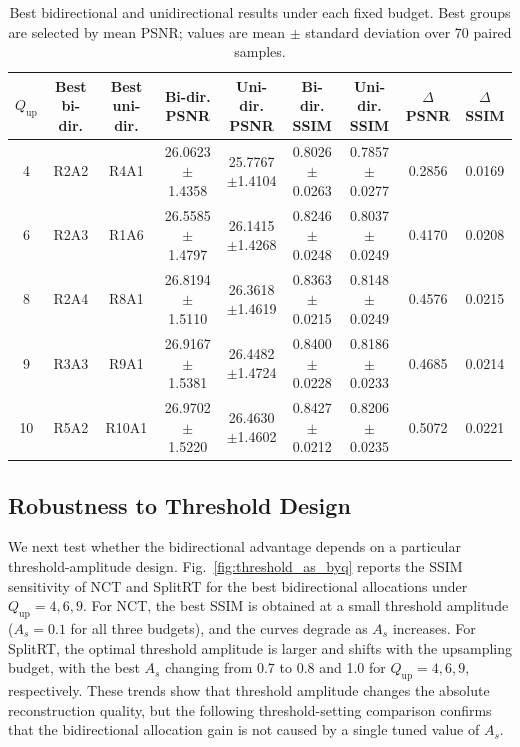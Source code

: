\documentclass[conference]{IEEEtran}
\begin{document}
\begin{table}[t]
\caption{Best bidirectional and unidirectional results under each fixed budget. Best groups are selected by mean PSNR; values are mean $\pm$ standard deviation over 70 paired samples.}
\begin{center}
\scriptsize
\setlength{\tabcolsep}{3pt}
\begin{tabular}{c c c c c c c c c}
\hline
$Q_{\mathrm{up}}$ & Best bi-dir. & Best uni-dir. & Bi-dir. PSNR & Uni-dir. PSNR & Bi-dir. SSIM & Uni-dir. SSIM & $\Delta$PSNR & $\Delta$SSIM \\
\hline
4  & R2A2 & R4A1  & 26.0623$\pm$1.4358 & 25.7767$\pm$1.4104 & 0.8026$\pm$0.0263 & 0.7857$\pm$0.0277 & 0.2856 & 0.0169 \\
6  & R2A3 & R1A6  & 26.5585$\pm$1.4797 & 26.1415$\pm$1.4268 & 0.8246$\pm$0.0248 & 0.8037$\pm$0.0249 & 0.4170 & 0.0208 \\
8  & R2A4 & R8A1  & 26.8194$\pm$1.5110 & 26.3618$\pm$1.4619 & 0.8363$\pm$0.0215 & 0.8148$\pm$0.0249 & 0.4576 & 0.0215 \\
9  & R3A3 & R9A1  & 26.9167$\pm$1.5381 & 26.4482$\pm$1.4724 & 0.8400$\pm$0.0228 & 0.8186$\pm$0.0233 & 0.4685 & 0.0214 \\
10 & R5A2 & R10A1 & 26.9702$\pm$1.5220 & 26.4630$\pm$1.4602 & 0.8427$\pm$0.0212 & 0.8206$\pm$0.0235 & 0.5072 & 0.0221 \\
\hline
\end{tabular}
\label{tab:main_gain}
\end{center}
\end{table}

\subsection{Robustness to Threshold Design}

We next test whether the bidirectional advantage depends on a particular threshold-amplitude design. Fig.~\ref{fig:threshold_as_byq} reports the SSIM sensitivity of NCT and SplitRT for the best bidirectional allocations under $Q_{\mathrm{up}}=4,6,9$. For NCT, the best SSIM is obtained at a small threshold amplitude ($A_s=0.1$ for all three budgets), and the curves degrade as $A_s$ increases. For SplitRT, the optimal threshold amplitude is larger and shifts with the upsampling budget, with the best $A_s$ changing from 0.7 to 0.8 and 1.0 for $Q_{\mathrm{up}}=4,6,9$, respectively. These trends show that threshold amplitude changes the absolute reconstruction quality, but the following threshold-setting comparison confirms that the bidirectional allocation gain is not caused by a single tuned value of $A_s$.
\end{document}
